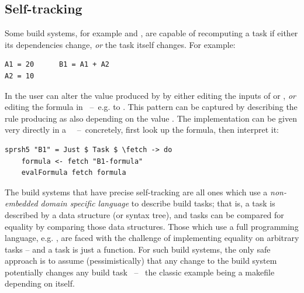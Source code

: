 
\subsection{Self-tracking}\label{sec-tracking-aspects}

Some build systems, for example \Excel and \Ninja, are capable of recomputing a
task if either its dependencies change, \emph{or} the task itself changes. For
example:

\vspace{1mm}
\begin{verbatim}
A1 = 20      B1 = A1 + A2
A2 = 10
\end{verbatim}
\vspace{1mm}

\noindent
In \Excel the user can alter the value produced by  by either editing
the inputs of  or , \emph{or} editing the formula in
~--~e.g. to . This pattern can be captured by describing
the rule producing  as also depending on the value .
The implementation can be given very directly in a
~~--~concretely, first look up the formula, then interpret
it:

\vspace{1mm}
\begin{verbatim}
sprsh5 "B1" = Just $ Task $ \fetch -> do
    formula <- fetch "B1-formula"
    evalFormula fetch formula
\end{verbatim}
\vspace{1mm}

\noindent
The build systems that have precise self-tracking are all ones which
use a \emph{non-embedded domain specific language} to describe build
tasks; that is, a task is described by a data structure (or syntax
tree), and tasks can be compared for equality by comparing those data
structures. Those which use a full programming language, e.g. \Shake,
are faced with the challenge of implementing equality on arbitrary
tasks -- and a task is just a function.  For such build systems, the
only safe approach is to assume (pessimistically) that any
change to the build system potentially changes any build task ~--~ the
classic example being a makefile depending on itself.

